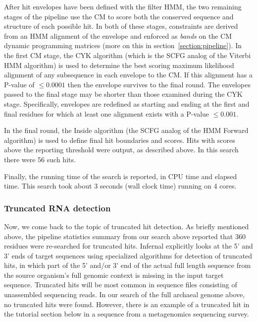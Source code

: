 After hit envelopes have been defined with the filter HMM, the two
remaining stages of the pipeline use the CM to score both the
conserved sequence and structure of each possible hit. In both of
these stages, constraints are derived from an HMM alignment of the
envelope and enforced as \emph{bands} on the CM dynamic programming
matrices (more on this in section~\ref{section:pipeline}). In the
first CM stage, the CYK algorithm (which is the SCFG analog of the
Viterbi HMM algorithm) is used to determine the best scoring maximum
likelihood alignment of any subsequence in each envelope to the CM. If
this alignment has a P-value of $\leq 0.0001$ then the envelope
survives to the final round. The envelopes passed to the final stage
may be shorter than those examined during the CYK stage. Specifically,
envelopes are redefined as starting and ending at the first and final
residues for which at least one alignment exists with a P-value $\leq
0.001$.

In the final round, the Inside algorithm (the SCFG analog of the HMM
Forward algorithm) is used to define final hit boundaries and
scores. Hits with scores above the reporting threshold were output, as
described above. In this search there were 56 such hits.

Finally, the running time of the search is reported, in CPU time and
elapsed time. This search took about 3 seconds (wall
clock time) running on 4 cores. 
\subsubsection{Truncated RNA detection}

Now, we come back to the topic of truncated hit detection.  As briefly
mentioned above, the pipeline statistics summary from our search above
reported that 360 residues were re-searched for truncated
hits. Infernal explicitly looks at the 5' and 3' ends of target
sequences using specialized algorithms for detection of truncated
hits, in which part of the 5' and/or 3' end of the actual full length
sequence from the source organism's full genomic context is missing in
the input target sequence. Truncated hits will be most common in
sequence files consisting of unassembled sequencing reads. In our
search of the full archaeal genome above, no truncated hits were
found. However, there is an example of a truncated hit in the
 tutorial section below in a sequence from a metagenomics
sequencing survey.

